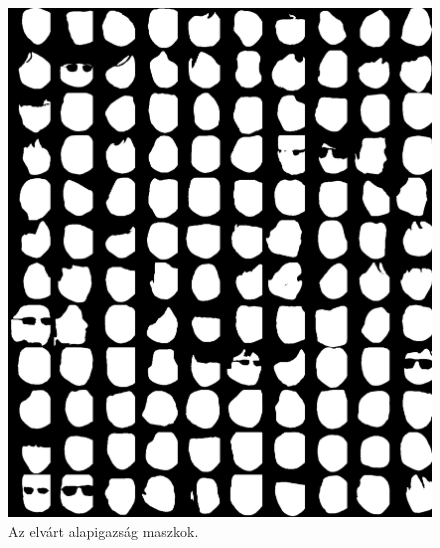 \documentclass[12pt,a4]{article}
\begin{document}
        \begin{figure}
        \includegraphics[width=0.9\linewidth]{test-masks-gt.png} 
        \caption{Az elvárt alapigazság maszkok.}
        \label{wrap-fig:gt-masks}
        \end{figure}
\end{document}
